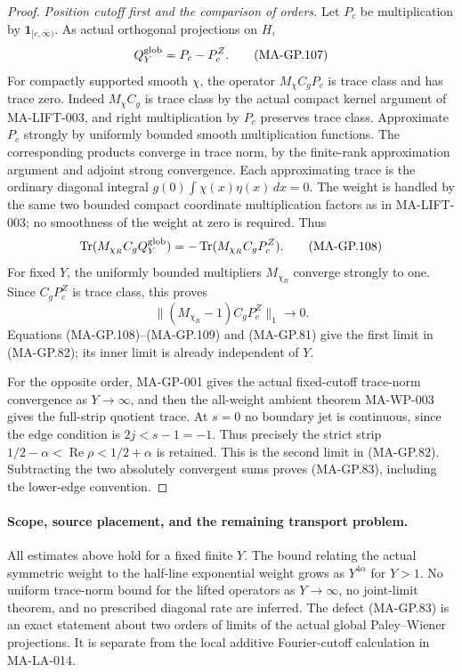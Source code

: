 \begin{proof}
\emph{Position cutoff first and the comparison of orders.}
Let $P_c$ be multiplication by $\mathbf1_{[c,\infty)}$.
As actual orthogonal projections on $H$,
\[
                        Q_Y^{\rm glob}=P_c-P_c^Z.
 \tag{MA-GP.107}
\]
For compactly supported smooth $\chi$, the operator
$M_\chi C_gP_c$ is trace class and has trace zero.
Indeed $M_\chi C_g$ is trace class by the actual compact
kernel argument of MA-LIFT-003, and right multiplication
by $P_c$ preserves trace class.
Approximate $P_c$ strongly by uniformly bounded smooth
multiplication functions.  The corresponding products
converge in trace norm, by the finite-rank approximation
argument and adjoint strong convergence.
Each approximating trace is the ordinary diagonal integral
$g(0)\int\chi(x)\eta(x)\,dx=0$.
The weight is handled by the same two bounded compact
coordinate multiplication factors as in MA-LIFT-003;
no smoothness of the weight at zero is required.
Thus
\[
 \operatorname{Tr}(M_{\chi_R}C_gQ_Y^{\rm glob})
                   =-\operatorname{Tr}(M_{\chi_R}C_gP_c^Z).
 \tag{MA-GP.108}
\]
For fixed $Y$, the uniformly bounded multipliers
$M_{\chi_R}$ converge strongly to one.
Since $C_gP_c^Z$ is trace class, this proves
\[
          \|(M_{\chi_R}-1)C_gP_c^Z\|_1\longrightarrow0.
 \tag{MA-GP.109}
\]
Equations (MA-GP.108)--(MA-GP.109) and (MA-GP.81)
give the first limit in (MA-GP.82); its inner limit
is already independent of $Y$.

For the opposite order, MA-GP-001 gives the actual
fixed-cutoff trace-norm convergence as $Y\to\infty$,
and then the all-weight ambient theorem MA-WP-003
gives the full-strip quotient trace.
At $s=0$ no boundary jet is continuous, since the
edge condition is $2j<s-1=-1$.
Thus precisely the strict strip
$1/2-\alpha<\operatorname{Re}\rho<1/2+\alpha$
is retained.  This is the second limit in (MA-GP.82).
Subtracting the two absolutely convergent sums proves
(MA-GP.83), including the lower-edge convention.
\end{proof}

\paragraph{Scope, source placement, and the remaining transport problem.}
All estimates above hold for a fixed finite $Y$.
The bound relating the actual symmetric weight to the half-line
exponential weight grows as $Y^{4\alpha}$ for $Y>1$.
No uniform trace-norm bound for the lifted operators as
$Y\to\infty$, no joint-limit theorem, and no prescribed
diagonal rate are inferred.
The defect (MA-GP.83) is an exact statement about two orders
of limits of the actual global Paley--Wiener projections.
It is separate from the local additive Fourier-cutoff
calculation in MA-LA-014.

